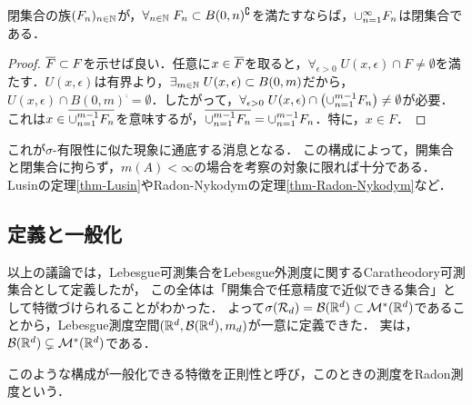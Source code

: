 \documentclass[uplatex, dvipdfmx]{jsreport}
\begin{document}
\begin{lemma}[位相空間論の補足]\label{lemma-general-topology}
    閉集合の族$(F_n)_{n\in\mathbb{N}}$が，$\forall_{n\in\mathbb{N}}\;F_n\subset B(0,n)^\complement$を満たすならば，$\cup_{n=1}^\infty F_n$は閉集合である．
\end{lemma}
\begin{proof}
    $\overline{F}\subset F$を示せば良い．任意に$x\in\overline{F}$を取ると，$\forall_{\epsilon>0}\;U(x,\epsilon)\cap F\ne\emptyset$を満たす．$U(x,\epsilon)$は有界より，$\exists_{m\in\mathbb{N}}\;U(x,\epsilon)\subset B(0,m)$だから，$U(x,\epsilon)\cap B(0,m)^\comp=\emptyset$．したがって，$\forall_{\epsilon>0}\;U(x,\epsilon)\cap\left(\cup_{n=1}^{m-1}F_n\right)\ne\emptyset$が必要．これは$x\in\overline{\cup_{n=1}^{m-1}F_n}$を意味するが，$\overline{\cup_{n=1}^{m-1}F_n}=\cup_{n=1}^{m-1}F_n$．特に，$x\in F$．
\end{proof}
\begin{remarks}
    これが$\sigma$-有限性に似た現象に通底する消息となる．
    この構成によって，開集合と閉集合に拘らず，$m(A)<\infty$の場合を考察の対象に限れば十分である．
    Lusinの定理\ref{thm-Lusin}やRadon-Nykodymの定理\ref{thm-Radon-Nykodym}など．
\end{remarks}

\subsection{定義と一般化}

\begin{tcolorbox}[colframe=ForestGreen, colback=ForestGreen!10!white,breakable,colbacktitle=ForestGreen!40!white,coltitle=black,fonttitle=\bfseries\sffamily,
    title=]
    以上の議論では，Lebesgue可測集合をLebesgue外測度に関するCaratheodory可測集合として定義したが，
    この全体は「開集合で任意精度で近似できる集合」として特徴づけられることがわかった．
    よって$\sigma(\mathcal{R}_d)=\mathcal{B}(\mathbb{R}^d)\subset\mathcal{M}^*(\mathbb{R}^d)$であることから，Lebesgue測度空間$(\mathbb{R}^d,\mathcal{B}(\mathbb{R}^d),m_d)$が一意に定義できた．
    実は，$\mathcal{B}(\mathbb{R}^d)\subsetneq\mathcal{M}^*(\mathbb{R}^d)$である．

    このような構成が一般化できる特徴を正則性と呼び，このときの測度をRadon測度という．
\end{tcolorbox}
\end{document}
